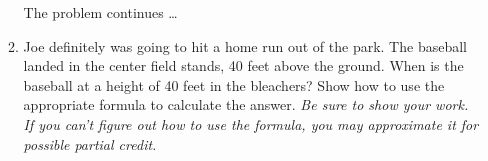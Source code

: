 \documentclass[11pt]{article}
\begin{document}
\begin{enumerate}
\begin{enumerate}
\newpage

\hspace{-.5in}  The problem continues \dots

\item Joe definitely was going to hit a home run out of the park. The baseball landed in the center field stands, 40 feet above the ground.  When is the baseball at a height of 40 feet in the bleachers?  Show how to use the appropriate formula to calculate the answer.  \emph{Be sure to show your work.  If you can't figure out how to use the formula, you may approximate it for possible partial credit.}
\vfill
\vfill
\end{enumerate}







\end{enumerate}
\end{document}
